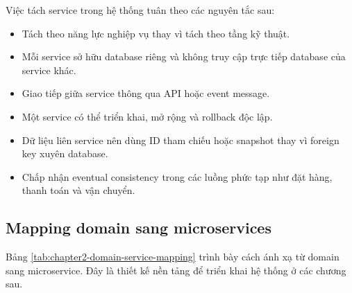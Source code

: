 \documentclass[../main.tex]{subfiles}
\begin{document}
Việc tách service trong hệ thống tuân theo các nguyên tắc sau:

\begin{itemize}
    \item Tách theo năng lực nghiệp vụ thay vì tách theo tầng kỹ thuật.
    \item Mỗi service sở hữu database riêng và không truy cập trực tiếp database của service khác.
    \item Giao tiếp giữa service thông qua API hoặc event message.
    \item Một service có thể triển khai, mở rộng và rollback độc lập.
    \item Dữ liệu liên service nên dùng ID tham chiếu hoặc snapshot thay vì foreign key xuyên database.
    \item Chấp nhận eventual consistency trong các luồng phức tạp như đặt hàng, thanh toán và vận chuyển.
\end{itemize}

\subsection{Mapping domain sang microservices}
\label{subsection:2.2.5}

Bảng \ref{tab:chapter2-domain-service-mapping} trình bày cách ánh xạ từ domain sang microservice. Đây là thiết kế nền tảng để triển khai hệ thống ở các chương sau.
\end{document}
